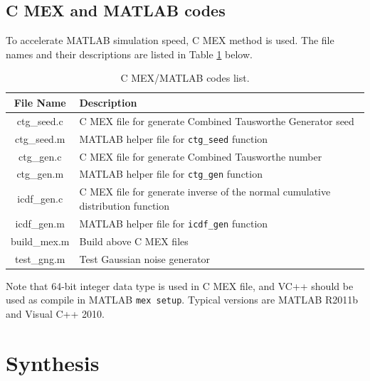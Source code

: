 \documentclass[a4paper, titlepage]{article}
\begin{document}
\subsection{C MEX and MATLAB codes}
To accelerate MATLAB simulation speed, C MEX method is used.
The file names and their descriptions are listed in Table \ref{tbl:cmex} below.
\begin{table}[!htbp]
\centering
\caption{C MEX/MATLAB codes list.}
\label{tbl:cmex}
\begin{tabular}{cp{8cm}}
    \addlinespace
    \toprule

    \textbf{File Name} & \textbf{Description} \\

    \midrule

    \textsf{ctg\_seed.c} &
        C MEX file for generate Combined Tausworthe Generator seed \\
    \textsf{ctg\_seed.m} &
        MATLAB helper file for \texttt{ctg\_seed} function \\
    \textsf{ctg\_gen.c} &
        C MEX file for generate Combined Tausworthe number \\
    \textsf{ctg\_gen.m} &
        MATLAB helper file for \texttt{ctg\_gen} function \\
    \textsf{icdf\_gen.c} &
        C MEX file for generate inverse of the normal cumulative distribution function \\
    \textsf{icdf\_gen.m} &
        MATLAB helper file for \texttt{icdf\_gen} function \\
    \textsf{build\_mex.m} &
        Build above C MEX files \\
    \textsf{test\_gng.m} &
        Test Gaussian noise generator \\

    \bottomrule
\end{tabular}
\end{table}

Note that 64-bit integer data type is used in C MEX file,
and VC++ should be used as compile in MATLAB \texttt{mex setup}.
Typical versions are MATLAB R2011b and Visual C++ 2010.


\section{Synthesis}
\end{document}
